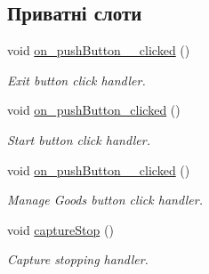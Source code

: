 \subsection*{Приватні слоти}
\begin{DoxyCompactItemize}
\item 
\hypertarget{classExUserScreen_a30a26ad349a33bac86a0848934c55655}{void \hyperlink{classExUserScreen_a30a26ad349a33bac86a0848934c55655}{on\-\_\-push\-Button\-\_\-\_\-clicked} ()}\label{classExUserScreen_a30a26ad349a33bac86a0848934c55655}

\begin{DoxyCompactList}\small\item\em Exit button click handler. \end{DoxyCompactList}\item 
\hypertarget{classExUserScreen_a4c7d4f567fc5d87bf459c4fe9ae09411}{void \hyperlink{classExUserScreen_a4c7d4f567fc5d87bf459c4fe9ae09411}{on\-\_\-push\-Button\-\_\-clicked} ()}\label{classExUserScreen_a4c7d4f567fc5d87bf459c4fe9ae09411}

\begin{DoxyCompactList}\small\item\em Start button click handler. \end{DoxyCompactList}\item 
\hypertarget{classExUserScreen_ad5eeeac687e031eb0b722957b20191cf}{void \hyperlink{classExUserScreen_ad5eeeac687e031eb0b722957b20191cf}{on\-\_\-push\-Button\-\_\-\_\-clicked} ()}\label{classExUserScreen_ad5eeeac687e031eb0b722957b20191cf}

\begin{DoxyCompactList}\small\item\em Manage Goods button click handler. \end{DoxyCompactList}\item 
\hypertarget{classExUserScreen_a10553577fa37a875152edf092a1caf51}{void \hyperlink{classExUserScreen_a10553577fa37a875152edf092a1caf51}{capture\-Stop} ()}\label{classExUserScreen_a10553577fa37a875152edf092a1caf51}

\begin{DoxyCompactList}\small\item\em Capture stopping handler. \end{DoxyCompactList}\end{DoxyCompactItemize}
